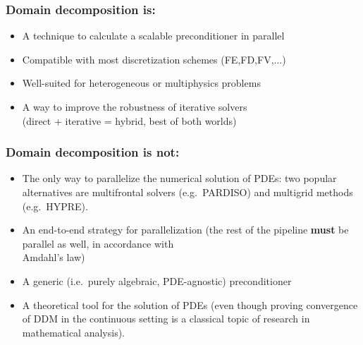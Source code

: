 \documentclass{beamer}
\begin{document}
\begin{frame}
\frametitle{Domain decomposition is:}
\begin{itemize}%
\item A technique to calculate a scalable preconditioner in parallel
\item Compatible with most discretization schemes (FE,FD,FV,...)
\item Well-suited for heterogeneous or multiphysics problems
\item A way to improve the robustness of iterative solvers\\
	(direct + iterative = hybrid, best of both worlds)
\end{itemize}
\end{frame}

\begin{frame}
\frametitle{Domain decomposition is not:}
\begin{itemize}%
\item The only way to parallelize the numerical solution of PDEs:
	two popular alternatives are multifrontal solvers (e.g.\ PARDISO)
	and multigrid methods (e.g.\ HYPRE).
\item An end-to-end strategy for parallelization
	(the rest of the pipeline \textbf{must} be parallel as well,
	in accordance with \\Amdahl's law)
\item A generic (i.e.\ purely algebraic, PDE-agnostic) preconditioner
\item A theoretical tool for the solution of PDEs (even though proving
	convergence of DDM in the continuous setting
	is a classical topic of research in mathematical analysis).
\end{itemize}
\end{frame}
\end{document}
